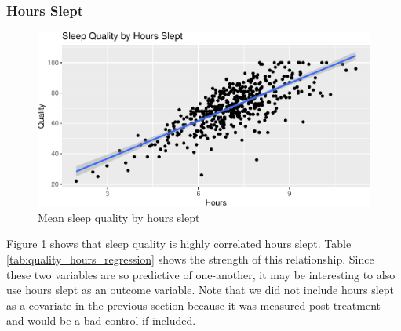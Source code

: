 \documentclass[12pt,]{article}
\begin{document}
\subsubsection{Hours Slept}\label{hours-slept}

\begin{figure}
\centering
\includegraphics{report_files/figure-latex/quality_by_hours_fig-1.pdf}
\caption{\label{fig:quality_by_hours_fig} Mean sleep quality by hours
slept}
\end{figure}

Figure \ref{fig:quality_by_hours_fig} shows that sleep quality is highly
correlated hours slept. Table \ref{tab:quality_hours_regression} shows
the strength of this relationship. Since these two variables are so
predictive of one-another, it may be interesting to also use hours slept
as an outcome variable. Note that we did not include hours slept as a
covariate in the previous section because it was measured post-treatment
and would be a bad control if included.
\end{document}
